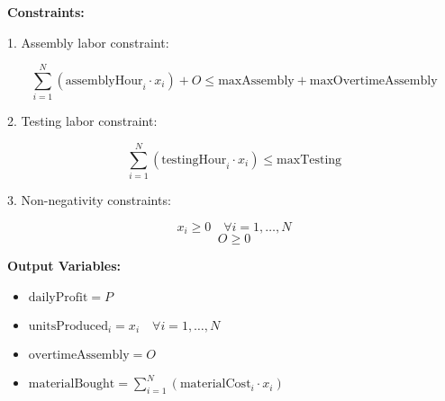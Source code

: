 \documentclass{article}
\begin{document}
\textbf{Constraints:}

1. Assembly labor constraint:

\[
\sum_{i=1}^{N} \left( \text{assemblyHour}_i \cdot x_i \right) + O \leq \text{maxAssembly} + \text{maxOvertimeAssembly}
\]

2. Testing labor constraint:

\[
\sum_{i=1}^{N} \left( \text{testingHour}_i \cdot x_i \right) \leq \text{maxTesting}
\]

3. Non-negativity constraints:

\[
x_i \geq 0 \quad \forall i = 1, \ldots, N
\]
\[
O \geq 0
\]

\textbf{Output Variables:}
\begin{itemize}
    \item \( \text{dailyProfit} = P \)
    \item \( \text{unitsProduced}_i = x_i \quad \forall i = 1, \ldots, N \)
    \item \( \text{overtimeAssembly} = O \)
    \item \( \text{materialBought} = \sum_{i=1}^{N} \left( \text{materialCost}_i \cdot x_i \right) \)
\end{itemize}
\end{document}
